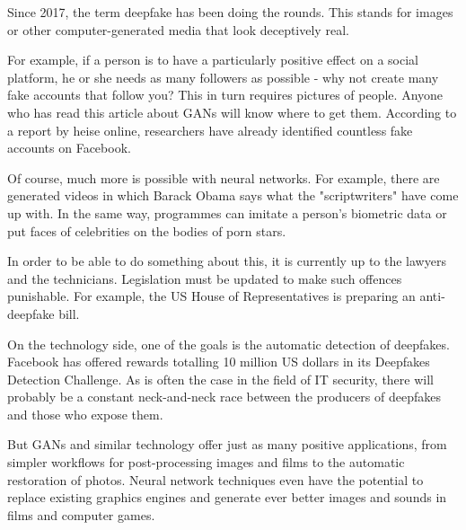 Since 2017, the term deepfake has been doing the rounds. This stands for images or other computer-generated media that look deceptively real.

For example, if a person is to have a particularly positive effect on a social platform, he or she needs as many followers as possible - why not create many fake accounts that follow you? This in turn requires pictures of people. Anyone who has read this article about GANs will know where to get them. According to a report by heise online, researchers have already identified countless fake accounts on Facebook.

Of course, much more is possible with neural networks. For example, there are generated videos in which Barack Obama says what the "scriptwriters" have come up with. In the same way, programmes can imitate a person's biometric data or put faces of celebrities on the bodies of porn stars. 

In order to be able to do something about this, it is currently up to the lawyers and the technicians. Legislation must be updated to make such offences punishable. For example, the US House of Representatives is preparing an anti-deepfake bill.

On the technology side, one of the goals is the automatic detection of deepfakes. Facebook has offered rewards totalling 10 million US dollars in its Deepfakes Detection Challenge. As is often the case in the field of IT security, there will probably be a constant neck-and-neck race between the producers of deepfakes and those who expose them.

But GANs and similar technology offer just as many positive applications, from simpler workflows for post-processing images and films to the automatic restoration of photos. Neural network techniques even have the potential to replace existing graphics engines and generate ever better images and sounds in films and computer games.
